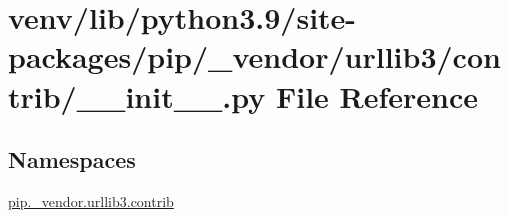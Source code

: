 \hypertarget{venv_2lib_2python3_89_2site-packages_2pip_2__vendor_2urllib3_2contrib_2____init_____8py}{}\section{venv/lib/python3.9/site-\/packages/pip/\+\_\+vendor/urllib3/contrib/\+\_\+\+\_\+init\+\_\+\+\_\+.py File Reference}
\label{venv_2lib_2python3_89_2site-packages_2pip_2__vendor_2urllib3_2contrib_2____init_____8py}
\subsection*{Namespaces}
\begin{DoxyCompactItemize}
\item 
 \hyperlink{namespacepip_1_1__vendor_1_1urllib3_1_1contrib}{pip.\+\_\+vendor.\+urllib3.\+contrib}
\end{DoxyCompactItemize}
